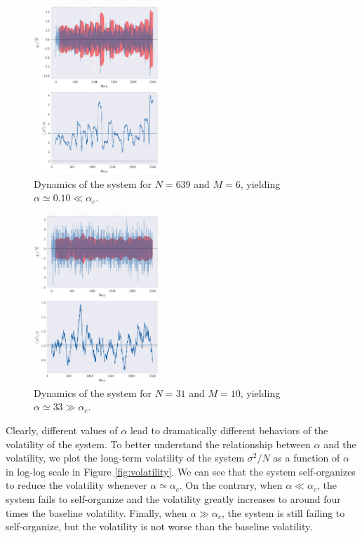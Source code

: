 \documentclass[a4paper, amsfonts, amssymb, amsmath, reprint, showkeys, nofootinbib, twoside]{revtex4-1}
\begin{document}
\begin{figure}[H]
    \centering
    \includegraphics[width=0.42\textwidth]{figures/M6_N639.png}
    \caption{Dynamics of the system for $N=639$ and $M=6$, yielding $\alpha \simeq 0.10 \ll \alpha_c$.}
    \label{fig:dynamics2}
\end{figure}

\begin{figure}[H]
    \centering
    \includegraphics[width=0.42\textwidth]{figures/M10_N31.png}
    \caption{Dynamics of the system for $N=31$ and $M=10$, yielding $\alpha \simeq 33 \gg \alpha_c$.}
    \label{fig:dynamics3}
\end{figure}

Clearly, different values of $\alpha$ lead to dramatically different behaviors of the volatility of the system. To better understand the relationship between $\alpha$ and the volatility, we plot the long-term volatility of the system $\sigma^2/N$ as a function of $\alpha$ in log-log scale in Figure \ref{fig:volatility}. We can see that the system self-organizes to reduce the volatility whenever $\alpha \simeq \alpha_c$. On the contrary, when $\alpha \ll \alpha_c$, the system fails to self-organize and the volatility greatly increases to around four times the baseline volatility. Finally, when $\alpha \gg \alpha_c$, the system is still failing to self-organize, but the volatility is not worse than the baseline volatility.
\end{document}
